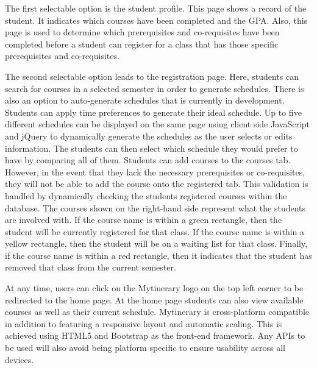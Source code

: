\documentclass[12pt]{article}
\begin{document}
The first selectable option is the student profile. This page shows a record of the student. It indicates which courses have been completed and the GPA. Also, this page is used to determine which prerequisites and co-requisites have been completed before a student can register for a class that has those specific prerequisites and co-requisites.

The second selectable option leads to the registration page. Here, students can search for courses in a selected semester in order to generate schedules. There is also an option to auto-generate schedules that is currently in development. Students can apply time preferences to generate their ideal schedule.  Up to five different schedules can be displayed on the same page using client side JavaScript and jQuery to dynamically generate the schedules as the user selects or edits information. The students can then select which schedule they would prefer to have by comparing all of them. Students can add courses to the courses tab. However, in the event that they lack the necessary prerequisites or co-requisites, they will not be able to add the course onto the registered tab. This validation is handled by dynamically checking the students registered courses within the database. The courses shown on the right-hand side represent what the students are involved with. If the course name is within a green rectangle, then the student will be currently registered for that class. If the course name is within a yellow rectangle, then the student will be on a waiting list for that class. Finally, if the course name is within a red rectangle, then it indicates that the student has removed that class from the current semester.

At any time, users can click on the Mytinerary logo on the top left corner to be redirected to the home page. At the home page students can also view available courses as well as their current schedule. Mytinerary is cross-platform compatible in addition to featuring a responsive layout and automatic scaling. This is achieved using HTML5 and Bootstrap as the front-end framework. Any APIs to be used will also avoid being platform specific to ensure usability across all devices.

\end{document}
